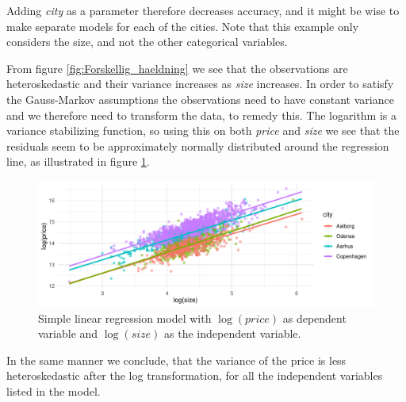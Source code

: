 Adding \textit{city} as a parameter therefore decreases accuracy, and it might be wise to make separate models for each of the cities. 
Note that this example only considers the size, and not the other categorical variables.



From figure \ref{fig:Forskellig_haeldning} we see that the observations are heteroskedastic and their variance increases as \textit{size} increases. 
In order to satisfy the Gauss-Markov assumptions the observations need to have constant variance and we therefore need to transform the data, to remedy this. 
The logarithm is a variance stabilizing function, so using this on both \textit{price} and \textit{size} we see that the residuals seem to be approximately normally distributed around the regression line, as illustrated in figure \ref{fig:Log_Model_plot}. 

\begin{figure}[H] 
    \centering
    \includegraphics[width = 1\textwidth]{figures/Nanna/Plot_forskellig_haeldning.pdf}
    \caption{Simple linear regression model with $\log(price)$ as dependent variable and $\log(size)$ as the independent variable.}
    \label{fig:Log_Model_plot}
\end{figure}

In the same manner we conclude, that the variance of the price is less heteroskedastic after the log transformation, for all the independent variables listed in the model.

